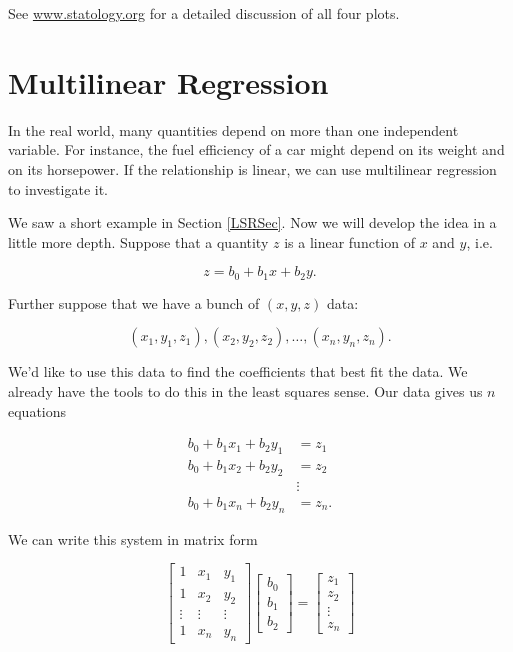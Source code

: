 \documentclass[
]{book}
\theoremstyle{definition}
\theoremstyle{definition}
\theoremstyle{definition}
\theoremstyle{definition}
\theoremstyle{remark}
\begin{document}
See \href{https://www.statology.org/diagnostic-plots-in-r/}{www.statology.org} \autocite{statology} for a detailed discussion of all four plots.

\section{Multilinear Regression}\label{multilinear-regression-1}

In the real world, many quantities depend on more than one independent variable. For instance, the fuel efficiency of a car might depend on its weight and on its horsepower. If the relationship is linear, we can use multilinear regression to investigate it.

We saw a short example in Section \ref{LSRSec}. Now we will develop the idea in a little more depth. Suppose that a quantity \(z\) is a linear function of \(x\) and \(y\), i.e.

\[z=b_0+b_1x+b_2y.\]

Further suppose that we have a bunch of \((x,y,z)\) data:

\[(x_1,y_1,z_1),(x_2,y_2,z_2),\dots,(x_n,y_n,z_n).\]

We'd like to use this data to find the coefficients that best fit the data. We already have the tools to do this in the least squares sense. Our data gives us \(n\) equations

\begin{align*}
    b_0+b_1x_1+b_2y_1&=z_1\\
    b_0+b_1x_2+b_2y_2&=z_2\\
    &\vdots\\
    b_0+b_1x_n+b_2y_n&=z_n.
\end{align*}

We can write this system in matrix form

\[\begin{bmatrix}1 & x_1 & y_1\\1 & x_2 & y_2\\ \vdots & \vdots & \vdots \\
1 & x_n & y_n\end{bmatrix}\begin{bmatrix}b_0\\b_1\\b_2\end{bmatrix}=\begin{bmatrix}z_1\\z_2\\ \vdots \\ z_n\end{bmatrix}\]
\end{document}

